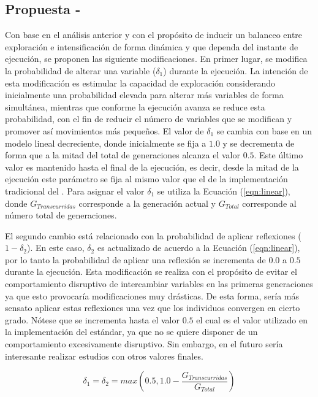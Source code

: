 \subsection{Propuesta - \DSBX{}}

Con base en el análisis anterior y con el propósito de inducir un balanceo entre exploración e intensificación de forma dinámica y que dependa del instante de ejecución, 
se proponen las siguiente modificaciones.
%
En primer lugar, se modifica la probabilidad de alterar una variable ($\delta_1$) durante la ejecución.
%
La intención de esta modificación es estimular la capacidad de exploración considerando inicialmente una probabilidad elevada 
para alterar más variables de forma simultánea, mientras que conforme la ejecución avanza se reduce esta probabilidad, con el fin de reducir
el número de variables que se modifican y promover así movimientos más pequeños.
%
El valor de $\delta_1$ se cambia con base en un modelo lineal decreciente, donde inicialmente se fija a $1.0$ y se decrementa de forma
que a la mitad del total de generaciones alcanza el valor $0.5$.
%
Este último valor es mantenido hasta el final de la ejecución, es decir, desde la mitad de la ejecución este parámetro se fija 
al mismo valor que el de la implementación tradicional del \SBX{}.
%
Para asignar el valor $\delta_1$ se utiliza la Ecuación (\ref{eqn:linear}), donde $G_{Transcurridas}$ corresponde a la generación actual 
y $G_{Total}$ corresponde al número total de generaciones.

El segundo cambio está relacionado con la probabilidad de aplicar reflexiones ($1 - \delta_2$).
%
En este caso, $\delta_2$ es actualizado de acuerdo a la Ecuación (\ref{eqn:linear}), por lo tanto la probabilidad de aplicar una reflexión se
incrementa de $0.0$ a $0.5$ durante la ejecución.
%
Esta modificación se realiza con el propósito de evitar el comportamiento disruptivo de intercambiar variables en las primeras generaciones 
ya que esto provocaría modificaciones muy drásticas.
%
De esta forma, sería más sensato aplicar estas reflexiones una vez que los individuos convergen en cierto grado.
%
Nótese que se incrementa hasta el valor $0.5$ el cual es el valor utilizado en la implementación del \SBX{} estándar, ya que no se quiere
disponer de un comportamiento excesivamente disruptivo.
%
Sin embargo, en el futuro sería interesante realizar estudios con otros valores finales.

\begin{equation}\label{eqn:linear}
	\delta_1 = \delta_2 = max \left (0.5, 1.0 - \frac{G_{Transcurridas}}{G_{Total}} \right )
\end{equation}

